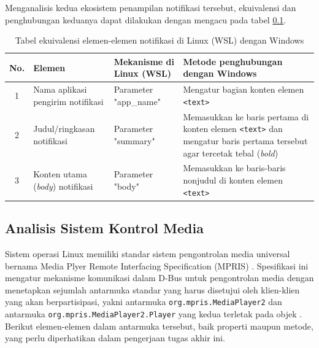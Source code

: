 Menganalisis kedua ekosistem penampilan notifikasi tersebut, ekuivalensi dan penghubungan keduanya dapat dilakukan dengan mengacu pada tabel \ref{}.

\begin{table}[h]
    \centering
    \caption{Tabel ekuivalensi elemen-elemen notifikasi di Linux (WSL) dengan Windows}
    \begin{tabularx}{\textwidth}{|c|p{3cm}|X|X|} \hline
        \textbf{No.} & \textbf{Elemen} & \textbf{Mekanisme di Linux (WSL)} & \textbf{Metode penghubungan dengan Windows}\\ \hline
        1 & Nama aplikasi pengirim notifikasi & Parameter "app\_name" & Mengatur bagian konten elemen \verb|<text>|\\ \hline
        2 & Judul/ringkasan notifikasi & Parameter "summary" & Memasukkan ke baris pertama di konten elemen \verb|<text>| dan mengatur baris pertama tersebut agar tercetak tebal (\textit{bold})\\ \hline
        3 & Konten utama (\textit{body}) notifikasi & Parameter "body" & Memasukkan ke baris-baris nonjudul di konten elemen \verb|<text>|\\ \hline
    \end{tabularx}
    \label{wsl-and-windows-notification-system-equivalence-table}
\end{table}

\subsection{Analisis Sistem Kontrol Media}

Sistem operasi Linux memiliki standar sistem pengontrolan media universal bernama Media Plyer Remote Interfacing Specification (MPRIS) \cite{xdg-mpris-specification}. Spesifikasi ini mengatur mekanisme komunikasi dalam D-Bus untuk pengontrolan media dengan menetapkan sejumlah antarmuka standar yang harus disetujui oleh klien-klien yang akan berpartisipasi, yakni antarmuka \verb|org.mpris.MediaPlayer2| dan antarmuka \verb|org.mpris.MediaPlayer2.Player| yang kedua terletak pada objek . Berikut elemen-elemen dalam antarmuka tersebut, baik properti maupun metode, yang perlu diperhatikan dalam pengerjaan tugas akhir ini.

